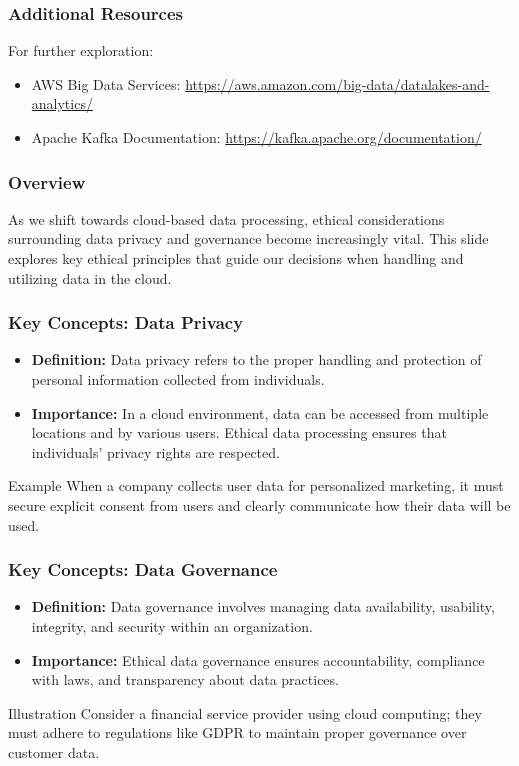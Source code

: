 \documentclass[aspectratio=169]{beamer}
\begin{document}
\begin{frame}[fragile]
    \frametitle{Additional Resources}
    For further exploration:
    \begin{itemize}
        \item AWS Big Data Services: \url{https://aws.amazon.com/big-data/datalakes-and-analytics/}
        \item Apache Kafka Documentation: \url{https://kafka.apache.org/documentation/}
    \end{itemize}
\end{frame}

\begin{frame}[fragile]
    \frametitle{Overview}
    As we shift towards cloud-based data processing, ethical considerations surrounding data privacy and governance become increasingly vital. This slide explores key ethical principles that guide our decisions when handling and utilizing data in the cloud.
\end{frame}

\begin{frame}[fragile]
    \frametitle{Key Concepts: Data Privacy}
    \begin{itemize}
        \item \textbf{Definition:} Data privacy refers to the proper handling and protection of personal information collected from individuals.
        \item \textbf{Importance:} In a cloud environment, data can be accessed from multiple locations and by various users. Ethical data processing ensures that individuals’ privacy rights are respected.
    \end{itemize}
    
    \begin{block}{Example}
        When a company collects user data for personalized marketing, it must secure explicit consent from users and clearly communicate how their data will be used.
    \end{block}
\end{frame}

\begin{frame}[fragile]
    \frametitle{Key Concepts: Data Governance}
    \begin{itemize}
        \item \textbf{Definition:} Data governance involves managing data availability, usability, integrity, and security within an organization.
        \item \textbf{Importance:} Ethical data governance ensures accountability, compliance with laws, and transparency about data practices.
    \end{itemize}
    
    \begin{block}{Illustration}
        Consider a financial service provider using cloud computing; they must adhere to regulations like GDPR to maintain proper governance over customer data.
    \end{block}
\end{frame}
\end{document}
